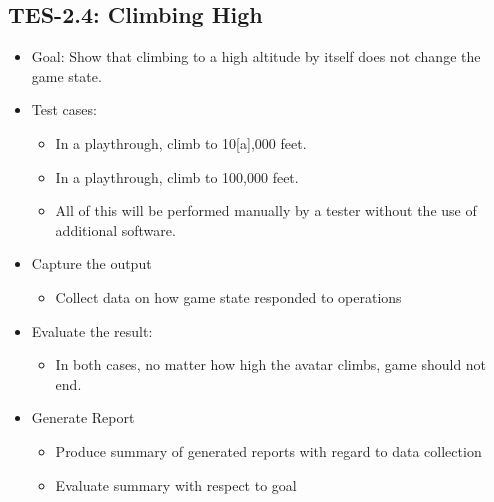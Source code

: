 \subsection{TES-2.4: Climbing High }
\begin{itemize}
\item Goal: Show that climbing to a high altitude by itself does not change
the game state. 
\item Test cases: 

\begin{itemize}
\item In a playthrough, climb to 10{[}a{]},000 feet. 
\item In a playthrough, climb to 100,000 feet. 
\item All of this will be performed manually by a tester without the use of additional software.
\end{itemize}
\item Capture the output 

\begin{itemize}
\item Collect data on how game state responded to operations 
\end{itemize}
\item Evaluate the result: 

\begin{itemize}
\item In both cases, no matter how high the avatar climbs, game should not
end. 
\end{itemize}
\item Generate Report 

\begin{itemize}
\item Produce summary of generated reports with regard to data collection 
\item Evaluate summary with respect to goal
\end{itemize}
\end{itemize}

